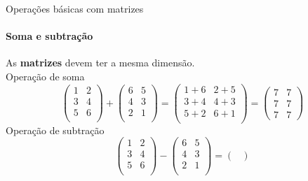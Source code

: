 \begin{frame}[t]{Operações básicas com matrizes} 
    \framesubtitle{Soma e subtração}
 
    As \textbf{matrizes} devem ter a mesma dimensão. \\
    \vspace*{0.3cm}
    Operação de soma
    \begin{equation}
        \begin{pmatrix}
            1 & 2 \\
            3 & 4 \\
            5 & 6 \\
        \end{pmatrix}
        +
        \begin{pmatrix}
            6  & 5 \\
            4  & 3 \\
            2  & 1 \\
        \end{pmatrix}
        =
        \begin{pmatrix}
            1 + 6  & 2 + 5  \\
            3 + 4  & 4 + 3  \\
            5 + 2  & 6 + 1  \\
        \end{pmatrix}
        =
        \begin{pmatrix}
            7  & 7 \\
            7  & 7 \\
            7  & 7 
        \end{pmatrix}
    \end{equation}
    \vspace*{0.3cm}
    Operação de subtração
    \begin{equation}
        \begin{pmatrix}
            1 & 2 \\
            3 & 4 \\
            5 & 6 \\
        \end{pmatrix}
        -
        \begin{pmatrix}
            6  & 5 \\
            4  & 3 \\
            2 & 1 \\
        \end{pmatrix}
        =
        \begin{pmatrix}

\end{pmatrix}
\end{equation}
\end{frame}
